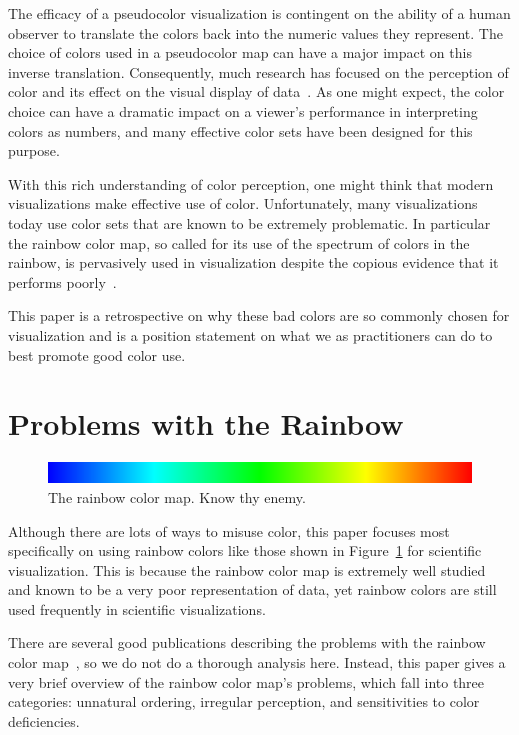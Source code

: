 \documentclass[letterpaper,twocolumn,fleqn]{article}
\newcommand*{\lcite}[1]{~\cite{#1}}
\begin{document}
The efficacy of a pseudocolor visualization is contingent on the ability of
a human observer to translate the colors back into the numeric values they
represent. The choice of colors used in a pseudocolor map can have a major
impact on this inverse translation. Consequently, much research has focused
on the perception of color and its effect on the visual display of
data\lcite{Brewer2005,Ware1988,Rheingans1999,Rogowitz1996,Silva2011}. As
one might expect, the color choice can have a dramatic impact on a viewer's
performance in interpreting colors as numbers, and many effective color
sets have been designed for this purpose.

With this rich understanding of color perception, one might think that
modern visualizations make effective use of color. Unfortunately, many
visualizations today use color sets that are known to be extremely
problematic. In particular the rainbow color map, so called for its use of
the spectrum of colors in the rainbow, is pervasively used in visualization
despite the copious evidence that it performs
poorly\lcite{Borland2007,Rogowitz1996,Rogowitz1998,Rheingans1999,Light2004,Ware2004}.

This paper is a retrospective on why these bad colors are so commonly
chosen for visualization and is a position statement on what we as
practitioners can do to best promote good color use.


\section{Problems with the Rainbow}

\begin{figure}[htb]
  \centering
  \includegraphics[width=.9\linewidth]{images/RainbowBar}
  \caption{The rainbow color map. Know thy enemy.}
  \label{fig:Rainbow}
\end{figure}

\noindent
Although there are lots of ways to misuse color, this paper focuses most
specifically on using rainbow colors like those shown in
Figure~\ref{fig:Rainbow} for scientific visualization. This is because the
rainbow color map is extremely well studied and known to be a very poor
representation of data, yet rainbow colors are still used frequently in
scientific visualizations.

There are several good publications describing the problems with the
rainbow color map\lcite{Borland2007,Light2004,Rogowitz1998}, so we do not
do a thorough analysis here. Instead, this paper gives a very brief
overview of the rainbow color map's problems, which fall into three
categories: unnatural ordering, irregular perception, and sensitivities to
color deficiencies.
\end{document}
